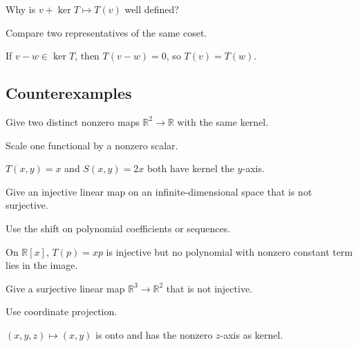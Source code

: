 \begin{exercise}\label{exr:i06-expand-09}
Why is \(v+\ker T\mapsto T(v)\) well defined?
\end{exercise}
\begin{hint}
Compare two representatives of the same coset.
\end{hint}
\begin{solution}
If \(v-w\in\ker T\), then \(T(v-w)=0\), so \(T(v)=T(w)\).
\end{solution}

\subsection*{Counterexamples}

\begin{exercise}\label{exr:i06-expand-10}
Give two distinct nonzero maps \(\mathbb R^2\to\mathbb R\) with the same kernel.
\end{exercise}
\begin{hint}
Scale one functional by a nonzero scalar.
\end{hint}
\begin{solution}
\(T(x,y)=x\) and \(S(x,y)=2x\) both have kernel the \(y\)-axis.
\end{solution}

\begin{exercise}\label{exr:i06-expand-11}
Give an injective linear map on an infinite-dimensional space that is not surjective.
\end{exercise}
\begin{hint}
Use the shift on polynomial coefficients or sequences.
\end{hint}
\begin{solution}
On \(\mathbb R[x]\), \(T(p)=xp\) is injective but no polynomial with nonzero constant term lies in the image.
\end{solution}

\begin{exercise}\label{exr:i06-expand-12}
Give a surjective linear map \(\mathbb R^3\to\mathbb R^2\) that is not injective.
\end{exercise}
\begin{hint}
Use coordinate projection.
\end{hint}
\begin{solution}
\((x,y,z)\mapsto(x,y)\) is onto and has the nonzero \(z\)-axis as kernel.
\end{solution}

